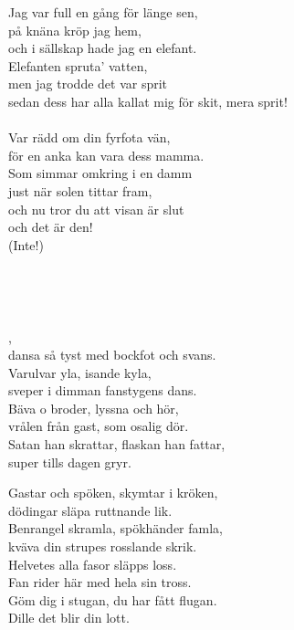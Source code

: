{{Jag var full en gång för länge sen,\\
på knäna kröp jag hem,\\
och i sällskap hade jag en elefant.\\
Elefanten spruta' vatten,\\
men jag trodde det var sprit\\
sedan dess har alla kallat mig för skit, mera sprit! \\

\melochtext{}\\
\songtext{}Var rädd om din fyrfota vän,\\
för en anka kan vara dess mamma.\\
Som simmar omkring i en damm\\
just när solen tittar fram,\\
och nu tror du att visan är slut\\
och det är den!\\
(Inte!)

\\
\newpage

 \\       

, \\
dansa så tyst med bockfot och svans.\\
Varulvar yla, isande kyla,\\
sveper i dimman fanstygens dans.\\
Bäva o broder, lyssna och hör,\\
vrålen från gast, som osalig dör.\\
Satan han skrattar, flaskan han fattar,\\
super tills dagen gryr.

Gastar och spöken, skymtar i kröken,\\
dödingar släpa ruttnande lik.\\
Benrangel skramla, spökhänder famla,\\
kväva din strupes rosslande skrik.\\
Helvetes alla fasor släpps loss.\\
Fan rider här med hela sin tross.\\
Göm dig i stugan, du har fått flugan.\\
Dille det blir din lott. \\

}}
